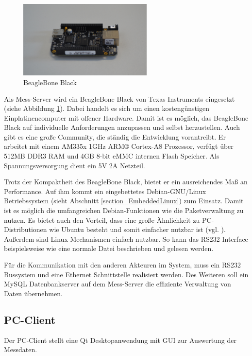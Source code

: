 \begin{figure}[H]
\begin{center}
\includegraphics[width=0.6\textwidth]{img/general/BeagleBoneBlack.png}
\caption{BeagleBone Black}
\label{figure_Beagleboneblack}
\end{center}
\end{figure}


Als Mess-Server wird ein BeagleBone Black von Texas Instruments eingesetzt (siehe Abbildung \ref{figure_Beagleboneblack}). Dabei handelt es sich um einen kostengünstigen Einplatinencomputer mit offener Hardware. Damit ist es möglich, das BeagleBone Black auf individuelle Anforderungen anzupassen und selbst herzustellen. Auch gibt es eine große Community, die ständig die Entwicklung vorantreibt.
Er arbeitet mit einem AM335x 1GHz ARM® Cortex-A8 Prozessor, verfügt über 512MB DDR3 RAM und 4GB 8-bit eMMC internen Flash Speicher. Als Spannungsversorgung dient ein 5V 2A Netzteil.

Trotz der Kompaktheit des BeagleBone Black, bietet er ein ausreichendes Maß an Performance. Auf ihm kommt ein eingebettetes Debian-GNU/Linux Betriebssystem (sieht Abschnitt \ref{section_EmbeddedLinux}) zum Einsatz. Damit ist es möglich die umfangreichen Debian-Funktionen wie die Paketverwaltung zu nutzen. Es bietet auch den Vorteil, dass eine große Ähnlichkeit zu PC-Distributionen wie Ubuntu besteht und somit einfacher nutzbar ist (vgl. \cite{schroeder2009embedded}).\\
Außerdem sind Linux Mechanismen einfach nutzbar. So kann das RS232 Interface beispielsweise wie eine normale Datei beschrieben und gelesen werden.

Für die Kommunikation mit den anderen Akteuren im System, muss ein RS232 Bussystem und eine Ethernet Schnittstelle realisiert werden. Des Weiteren soll ein MySQL Datenbankserver auf dem Mess-Server die effiziente Verwaltung von Daten übernehmen.

\subsection{PC-Client}
\label{section_PC-Client}
Der PC-Client stellt eine Qt Desktopanwendung mit \ac{GUI} zur Auswertung der Messdaten.


